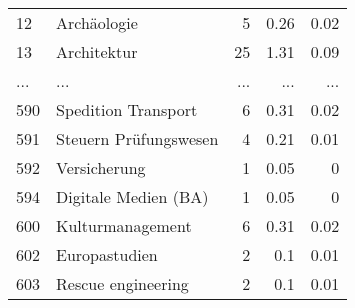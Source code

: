 \begin{longtable}{lXrrr}
        12 & \multicolumn{1}{X}{Archäologie} & %
          \num{5} &
          \num[round-mode=places,round-precision=2]{0.26} &
          \num[round-mode=places,round-precision=2]{0.02} \\
        13 & \multicolumn{1}{X}{Architektur} & %
          \num{25} &
          \num[round-mode=places,round-precision=2]{1.31} &
          \num[round-mode=places,round-precision=2]{0.09} \\
       ... & ... & ... & ... & ... \\
        590 & \multicolumn{1}{X}{Spedition Transport} & %
          \num{6} &
          \num[round-mode=places,round-precision=2]{0.31} &
          \num[round-mode=places,round-precision=2]{0.02} \\

        591 & \multicolumn{1}{X}{Steuern Prüfungswesen} & %
          \num{4} &
          \num[round-mode=places,round-precision=2]{0.21} &
          \num[round-mode=places,round-precision=2]{0.01} \\

        592 & \multicolumn{1}{X}{Versicherung} & %
          \num{1} &
          \num[round-mode=places,round-precision=2]{0.05} &
          \num[round-mode=places,round-precision=2]{0} \\

        594 & \multicolumn{1}{X}{Digitale Medien (BA)} & %
          \num{1} &
          \num[round-mode=places,round-precision=2]{0.05} &
          \num[round-mode=places,round-precision=2]{0} \\

        600 & \multicolumn{1}{X}{Kulturmanagement} & %
          \num{6} &
          \num[round-mode=places,round-precision=2]{0.31} &
          \num[round-mode=places,round-precision=2]{0.02} \\

        602 & \multicolumn{1}{X}{Europastudien} & %
          \num{2} &
          \num[round-mode=places,round-precision=2]{0.1} &
          \num[round-mode=places,round-precision=2]{0.01} \\

        603 & \multicolumn{1}{X}{Rescue engineering} & %
          \num{2} &
          \num[round-mode=places,round-precision=2]{0.1} &
          \num[round-mode=places,round-precision=2]{0.01} \\


\end{longtable}
